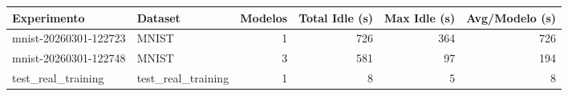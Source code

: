\begin{tabular}{llrrrr}
\toprule
Experimento & Dataset & Modelos & Total Idle (s) & Max Idle (s) & Avg/Modelo (s) \\
\midrule
mnist-20260301-122723 & MNIST & 1 & 726 & 364 & 726 \\
mnist-20260301-122748 & MNIST & 3 & 581 & 97 & 194 \\
test_real_training & test_real_training & 1 & 8 & 5 & 8 \\
\bottomrule
\end{tabular}